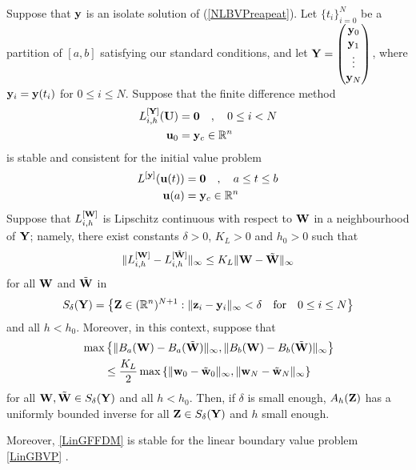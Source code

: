 \begin{theorem}
Suppose that $\mathbf{y}$ is an isolate solution of (\ref{NLBVPreapeat}).
Let $\{t_i\}_{i=0}^N$ be a partition of $[a,b]$ satisfying our
standard conditions, and let
$\displaystyle \mathbf{Y} = \begin{pmatrix} \mathbf{y}_0 \\
\mathbf{y}_1 \\ \vdots \\ \mathbf{y}_N \end{pmatrix}$,
where $\mathbf{y}_i = \mathbf{y}(t_i)$ for $0\leq i \leq N$.
Suppose that the finite difference method
\begin{equation} \label{MforLinIVP}
\begin{split}
L^{[\mathbf{Y}]}_{i,h} (\mathbf{U}) &= \mathbf{0} \quad , \quad 0 \leq i < N \\
\mathbf{u}_0 &= \mathbf{y}_c \in \mathbb{R}^n
\end{split}
\end{equation}
is stable and consistent for the initial value problem
\begin{equation} \label{LinIVP}
\begin{split}
L^{[\mathbf{y}]}(\mathbf{u}(t)) &= \mathbf{0} \quad , \quad a \leq t \leq b \\
\mathbf{u}(a) &= \mathbf{y}_c \in \mathbb{R}^n
\end{split}
\end{equation}
Suppose that $L^{[\mathbf{W}]}_{i,h}$ is Lipschitz continuous
with respect to $\mathbf{W}$ in a neighbourhood of $\mathbf{Y}$; namely,
there exist constants $\delta >0$, $K_L>0$ and $h_0 > 0$ such that
\begin{equation} \label{LipFDM}
\| L^{[\mathbf{W}]}_{i,h} - L^{[\tilde{\mathbf{W}}]}_{i,h} \|_\infty
\leq K_L \| \mathbf{W} - \tilde{\mathbf{W}} \|_\infty
\end{equation}
for all $\mathbf{W}$ and $\tilde{\mathbf{W}}$ in
\[
S_\delta(\mathbf{Y}) = \left\{ \mathbf{Z} \in (\mathbb{R}^n)^{N+1} :
\| \mathbf{z}_i - \mathbf{y}_i \|_\infty < \delta
\quad \text{for} \quad 0 \leq i \leq N \right\}
\]
and all $h < h_0$.  Moreover, in this context, suppose that
\begin{equation} \label{Cont_BC}
\begin{split}
& \max \left\{ \| B_a(\mathbf{W}) - B_a(\tilde{\mathbf{W}}) \|_\infty ,
\| B_b(\mathbf{W}) - B_b(\tilde{\mathbf{W}}) \|_\infty \right\} \\
&\qquad \leq \frac{K_L}{2} \max \left\{\| \mathbf{w}_0-\tilde{\mathbf{w}}_0 \|_\infty,
\| \mathbf{w}_N-\tilde{\mathbf{w}}_N \|_\infty \right\}
\end{split}
\end{equation}
for all $\mathbf{W}, \tilde{\mathbf{W}} \in S_\delta(\mathbf{Y})$ and all $h < h_0$.
Then, if $\delta$ is small enough, $A_h(\mathbf{Z})$ has a uniformly
bounded inverse for all $\mathbf{Z} \in S_\delta(\mathbf{Y})$ and $h$
small enough.

Moreover, \ref{LinGFFDM} is stable for the linear boundary value problem
\ref{LinGBVP} \footnotemark.
\label{FDM_stable}
\end{theorem}

